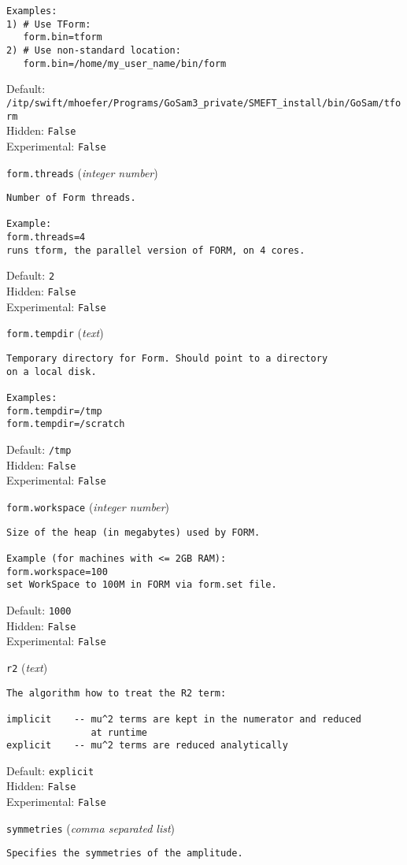\begin{basedescript}{\desclabelstyle{\pushlabel}}
\begin{verbatim}
Examples:
1) # Use TForm:
   form.bin=tform
2) # Use non-standard location:
   form.bin=/home/my_user_name/bin/form
\end{verbatim}
Default: \verb|/itp/swift/mhoefer/Programs/GoSam3_private/SMEFT_install/bin/GoSam/tform|
\\Hidden: \verb|False|
\\Experimental: \verb|False|
\\\item[\colorbox{gray!30}{\texttt{form.threads}}] (\textit{integer number})
\begin{verbatim}
Number of Form threads.

Example:
form.threads=4
runs tform, the parallel version of FORM, on 4 cores.
\end{verbatim}
Default: \verb|2|
\\Hidden: \verb|False|
\\Experimental: \verb|False|
\\\item[\colorbox{gray!30}{\texttt{form.tempdir}}] (\textit{text})
\begin{verbatim}
Temporary directory for Form. Should point to a directory
on a local disk.

Examples:
form.tempdir=/tmp
form.tempdir=/scratch
\end{verbatim}
Default: \verb|/tmp|
\\Hidden: \verb|False|
\\Experimental: \verb|False|
\\\item[\colorbox{gray!30}{\texttt{form.workspace}}] (\textit{integer number})
\begin{verbatim}
Size of the heap (in megabytes) used by FORM.

Example (for machines with <= 2GB RAM):
form.workspace=100
set WorkSpace to 100M in FORM via form.set file.
\end{verbatim}
Default: \verb|1000|
\\Hidden: \verb|False|
\\Experimental: \verb|False|
\\\item[\colorbox{gray!30}{\texttt{r2}}] (\textit{text})
\begin{verbatim}
The algorithm how to treat the R2 term:

implicit    -- mu^2 terms are kept in the numerator and reduced
               at runtime
explicit    -- mu^2 terms are reduced analytically
\end{verbatim}
Default: \verb|explicit|
\\Hidden: \verb|False|
\\Experimental: \verb|False|
\\\item[\colorbox{gray!30}{\texttt{symmetries}}] (\textit{comma separated list})
\begin{verbatim}
Specifies the symmetries of the amplitude.


\end{verbatim}
\end{basedescript}
